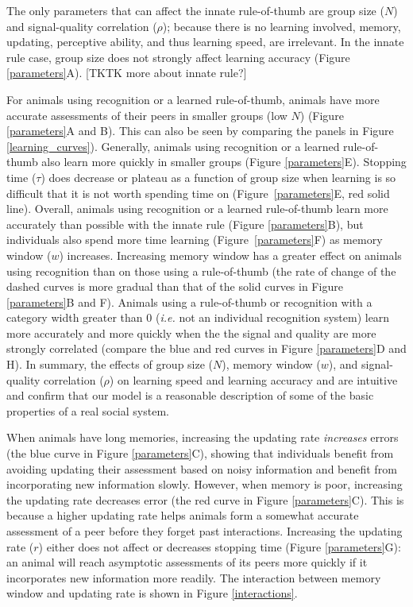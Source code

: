 The only parameters that can affect the innate rule-of-thumb are group size ($N$) and signal-quality correlation ($\rho$); because there is no learning involved, memory, updating, perceptive ability, and thus learning speed, are irrelevant. In the innate rule case, group size does not strongly affect learning accuracy (Figure \ref{parameters}A). [TKTK more about innate rule?]

For animals using recognition or a learned rule-of-thumb, animals have more accurate assessments of their peers in smaller groups (low $N$) (Figure \ref{parameters}A and B). This can also be seen by comparing the panels in Figure \ref{learning_curves}). Generally, animals using recognition or a learned rule-of-thumb also learn more quickly in smaller groups (Figure \ref{parameters}E). Stopping time ($\tau$) does decrease or plateau as a function of group size when learning is so difficult that it is not worth spending time on (Figure~\ref{parameters}E, red solid line). Overall, animals using recognition or a learned rule-of-thumb learn more accurately than possible with the innate rule (Figure \ref{parameters}B), but individuals also spend more time learning (Figure~\ref{parameters}F) as memory window ($w$) increases. Increasing memory window has a greater effect on animals using recognition than on those using a rule-of-thumb (the rate of change of the dashed curves is more gradual than that of the solid curves in Figure \ref{parameters}B and F).  Animals using a rule-of-thumb or recognition with a category width greater than $0$ (\textit{i.e. }not an individual recognition system) learn more accurately and more quickly when the the signal and quality are more strongly correlated (compare the blue and red curves in Figure \ref{parameters}D and H). In summary, the effects of group size ($N$), memory window ($w$), and signal-quality correlation ($\rho$) on learning speed and learning accuracy and are intuitive and confirm that our model is a reasonable description of some of the basic properties of a real social system. 
 
When animals have long memories, increasing the updating rate \emph{increases} errors (the blue curve in Figure \ref{parameters}C), showing that individuals benefit from avoiding updating their assessment based on noisy information and benefit from incorporating new information slowly. However, when memory is poor, increasing the updating rate decreases error (the red curve in Figure \ref{parameters}C). This is because a higher updating rate helps animals form a somewhat accurate assessment of a peer before they forget past interactions. Increasing the updating rate ($r$) either does not affect or decreases stopping time (Figure \ref{parameters}G): an animal will reach asymptotic assessments of its peers more quickly if it incorporates new information more readily. The interaction between memory window and updating rate is shown in Figure \ref{interactions}.
 

